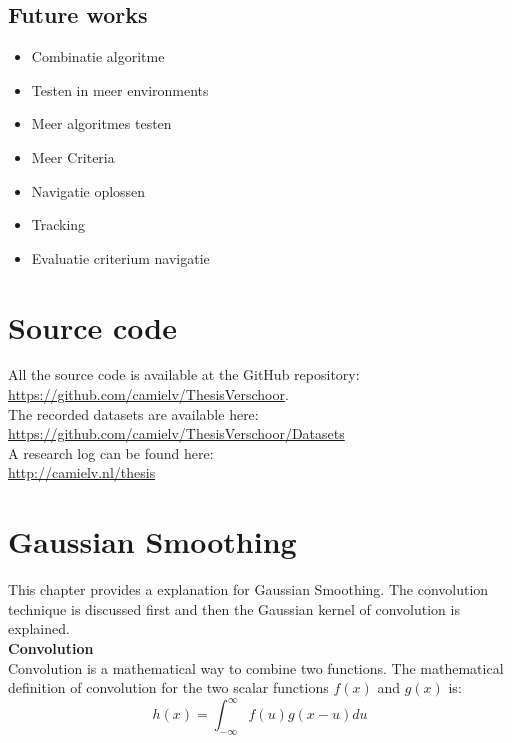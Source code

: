 \documentclass[a4paper]{article}
\begin{document}
\subsection{Future works}
\begin{itemize}
\item Combinatie algoritme
\item Testen in meer environments
\item Meer algoritmes testen
\item Meer Criteria
\item Navigatie oplossen
\item Tracking
\item Evaluatie criterium navigatie
\end{itemize}
\newpage
\begin{appendices}
\section{Source code}
\label{SOURCE_CODE}
All the source code is available at the GitHub repository:\\ \url{https://github.com/camielv/ThesisVerschoor}.\\
The recorded datasets are available here:\\
\url{https://github.com/camielv/ThesisVerschoor/Datasets}\\
A research log can be found here:\\
\url{http://camielv.nl/thesis}

\newpage
\section{Gaussian Smoothing}
\label{GAUSSIAN_SMOOTHING}
This chapter provides a explanation for Gaussian Smoothing. The convolution technique is discussed first and then the Gaussian kernel of convolution is explained.\\

\noindent\textbf{Convolution}\\
Convolution is a mathematical way to combine two functions. The mathematical definition of convolution for the two scalar functions $f(x)$ and $g(x)$ is:
\begin{equation*}
h(x) = \int_{-\infty}^\infty f(u)g(x - u)du
\end{equation*}


\end{appendices}
\end{document}
